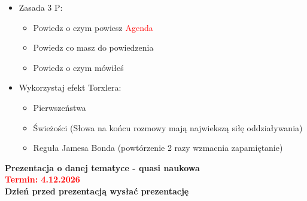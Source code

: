 \documentclass[]{article}
\begin{document}
\begin{itemize}
	\begin{itemize}
		\item Who 
		\item Why
		\item Where
		\item When
		\item What and how?
	\end{itemize}
	\item Zasada 3 P:
	\begin{itemize}
		\item Powiedz o czym powiesz \textcolor{red}{Agenda}
		\item Powiedz co masz do powiedzenia
		\item Powiedz o czym mówiłeś
	\end{itemize}
	\item Wykorzystaj efekt Torxlera:
	\begin{itemize}
		\item Pierwszeństwa
		\item Świeżości (Słowa na końcu rozmowy mają najwiekszą siłę oddziaływania)
		\item Reguła Jamesa Bonda (powtórzenie 2 razy wzmacnia zapamiętanie)
	\end{itemize}
	
\end{itemize}

\noindent \textbf{Prezentacja o danej tematyce - quasi naukowa}\\
\Huge \noindent \textbf{\textcolor{red}{Termin: 4.12.2026}} \\
\noindent \textbf{Dzień przed prezentacją wysłać prezentację}
\end{document}
